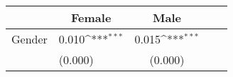 {
\def\sym#1{\ifmmode^{#1}\else\(^{#1}\)\fi}
\begin{tabular*}{.4\hsize}{@{\hskip\tabcolsep\extracolsep\fill}l*{2}{lc}}
\toprule
                &\multicolumn{1}{c}{Female}&\multicolumn{1}{c}{Male}\\
\midrule
Gender          &    0.010\sym{***}&    0.015\sym{***}\\
                &  (0.000)         &  (0.000)         \\
\bottomrule
\end{tabular*}
}
